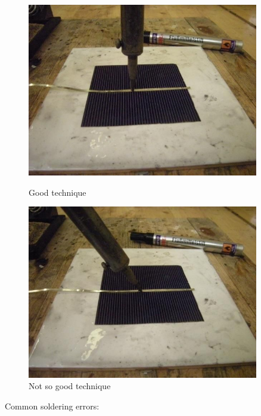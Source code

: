 \documentclass{article}
\theoremstyle{definition}
\theoremstyle{definition}
\theoremstyle{remark}
\begin{document}
    \begin{figure}[!ht]
      \begin{minipage}{0.5\textwidth}
          \centering
          \includegraphics[width=0.9\textwidth]{../Images/image_2_1_(good_technique).png}
          \caption*{Good technique}
      \end{minipage}\hfill
      \begin{minipage}{0.5\textwidth}
          \centering
          \includegraphics[width=0.9\textwidth]{../Images/image_2_2_(not_so_good_technique).png}
          \caption*{Not so good technique}
      \end{minipage}
    \end{figure}

    Common soldering errors:
\end{document}
